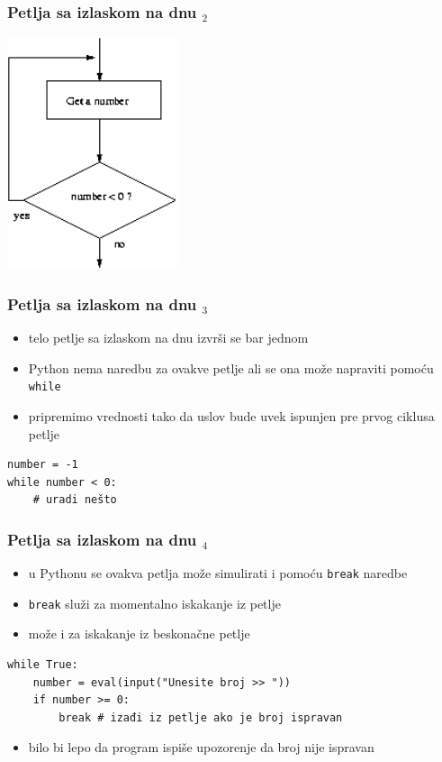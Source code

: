 \documentclass[utf8,compress]{beamer}
\begin{document}
\begin{frame}[fragile]
  \frametitle{Petlja sa izlaskom na dnu $_2$}
  \begin{center}
    \includegraphics[width=5cm]{pic20}
  \end{center}
\end{frame}

\begin{frame}[fragile]
  \frametitle{Petlja sa izlaskom na dnu $_3$}
  \begin{itemize}
    \item telo petlje sa izlaskom na dnu izvrši se  bar jednom
    \item Python nema naredbu za ovakve petlje ali se ona može napraviti pomoću \texttt{while}
    \item pripremimo vrednosti tako da uslov bude uvek ispunjen pre prvog ciklusa petlje
  \end{itemize}
\begin{verbatim}
number = -1
while number < 0:
    # uradi nešto
\end{verbatim}
\end{frame}

\begin{frame}[fragile]
  \frametitle{Petlja sa izlaskom na dnu $_4$}
  \begin{itemize}
    \item u Pythonu se ovakva petlja može simulirati i pomoću \texttt{break} naredbe
    \item \texttt{break} služi za momentalno iskakanje iz petlje
    \item može i za iskakanje iz beskonačne petlje
  \end{itemize}
\begin{verbatim}
while True:
    number = eval(input("Unesite broj >> "))
    if number >= 0: 
        break # izađi iz petlje ako je broj ispravan
\end{verbatim}
  \begin{itemize}
    \item bilo bi lepo da program ispiše upozorenje da broj nije ispravan
  \end{itemize}
\end{frame}
\end{document}
